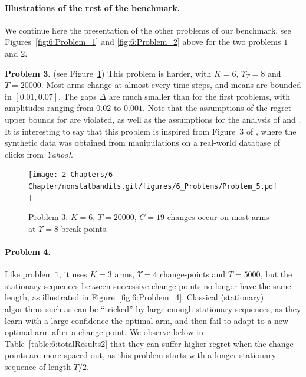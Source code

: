 \paragraph{Illustrations of the rest of the benchmark.}\label{par:6:benchmark2}

We continue here the presentation of the other problems of our benchmark, see Figures~\ref{fig:6:Problem_1} and \ref{fig:6:Problem_2} above for the two problems $1$ and $2$.

\textbf{Problem $\bm 3$.} (see Figure~\ref{fig:6:Problem_5}) This problem is harder, with $K=6$, $\Upsilon_T=8$ and $T=20000$.
Most arms change at almost every time steps,
and means are bounded in $[0.01, 0.07]$.
The gaps $\Delta$ are much smaller than for the first problems, with amplitudes ranging from $0.02$ to $0.001$.
Note that the assumptions of the regret upper bounds for \GLRklUCB{} are violated, as well as the assumptions for the analysis of \MUCB{} and \CUSUMUCB.
It is interesting to say that this problem is inspired from Figure~3 of \cite{CaoZhenKvetonXie18}, where the synthetic data was obtained from manipulations on a real-world database of clicks from \emph{Yahoo!}.

\begin{figure}[h!]  %
    \centering
    \texttt{[image: 2-Chapters/6-Chapter/nonstatbandits.git/figures/6\_Problems/Problem\_5.pdf]}
    \caption{Problem $3$: $K=6$, $T=20000$, $C=19$ changes occur on most arms at $\Upsilon=8$ break-points.}
    \label{fig:6:Problem_5}
\end{figure}


\paragraph{Problem 4.}

Like problem $1$, it uses $K=3$ arms, $\Upsilon=4$ change-points and $T=5000$,
but the stationary sequences between successive change-points no longer have the same length, as illustrated in Figure~\ref{fig:6:Problem_4}.
Classical (stationary) algorithms such as \klUCB{} can be ``tricked'' by large enough stationary sequences, as they learn with a large confidence the optimal arm, and then fail to adapt to a new optimal arm after a change-point.
We observe below in Table~\ref{table:6:totalResults2} that they can suffer higher regret when the change-points are more spaced out, as this problem starts with a longer stationary sequence of length $T/2$.

